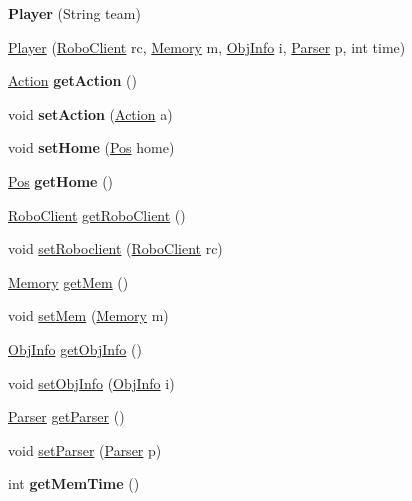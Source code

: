 \begin{DoxyCompactItemize}
\item 
\hypertarget{classPlayer_a072996becca020ca2c95b241eee356e3}{
{\bfseries Player} (String team)}
\label{classPlayer_a072996becca020ca2c95b241eee356e3}

\item 
\hyperlink{classPlayer_afe31dd3fe679bcba10385271c37ffd1a}{Player} (\hyperlink{classRoboClient}{RoboClient} rc, \hyperlink{classMemory}{Memory} m, \hyperlink{classObjInfo}{ObjInfo} i, \hyperlink{classParser}{Parser} p, int time)
\item 
\hypertarget{classPlayer_aaec2cce8cabaa09250aa111b5a189877}{
\hyperlink{classAction}{Action} {\bfseries getAction} ()}
\label{classPlayer_aaec2cce8cabaa09250aa111b5a189877}

\item 
\hypertarget{classPlayer_ae3515d6fa2bc0f9a5b1f3c754d9010f9}{
void {\bfseries setAction} (\hyperlink{classAction}{Action} a)}
\label{classPlayer_ae3515d6fa2bc0f9a5b1f3c754d9010f9}

\item 
\hypertarget{classPlayer_a37c708420f7230019e80d664533eddc8}{
void {\bfseries setHome} (\hyperlink{classPos}{Pos} home)}
\label{classPlayer_a37c708420f7230019e80d664533eddc8}

\item 
\hypertarget{classPlayer_a90a227e48446e51923377c495b39f008}{
\hyperlink{classPos}{Pos} {\bfseries getHome} ()}
\label{classPlayer_a90a227e48446e51923377c495b39f008}

\item 
\hyperlink{classRoboClient}{RoboClient} \hyperlink{classPlayer_a633389a933930a00f75601ea957caa83}{getRoboClient} ()
\item 
void \hyperlink{classPlayer_a70a35e4a1de2cc70d947adffc0e2d580}{setRoboclient} (\hyperlink{classRoboClient}{RoboClient} rc)
\item 
\hyperlink{classMemory}{Memory} \hyperlink{classPlayer_ab43d9af06168c486d9fa0539103102a0}{getMem} ()
\item 
void \hyperlink{classPlayer_a92bd7c2bbebfc30ec332d6e6b182f9a8}{setMem} (\hyperlink{classMemory}{Memory} m)
\item 
\hyperlink{classObjInfo}{ObjInfo} \hyperlink{classPlayer_a6ca7539da0375519ff9f5993b19073f0}{getObjInfo} ()
\item 
void \hyperlink{classPlayer_a51bf665263845828767153fb4b418337}{setObjInfo} (\hyperlink{classObjInfo}{ObjInfo} i)
\item 
\hyperlink{classParser}{Parser} \hyperlink{classPlayer_a8898fbd58b68f21318bd83a3a4446a1f}{getParser} ()
\item 
void \hyperlink{classPlayer_a914ba43cef17a1ce6f210311155925a6}{setParser} (\hyperlink{classParser}{Parser} p)
\item 
\hypertarget{classPlayer_a0f037644cf072cb8f24cd98919be4a02}{
int {\bfseries getMemTime} ()}
\label{classPlayer_a0f037644cf072cb8f24cd98919be4a02}


\end{DoxyCompactItemize}
